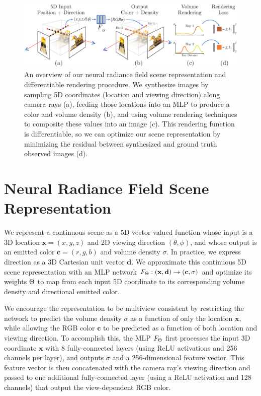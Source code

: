 \documentclass[runningheads]{llncs}
\begin{document}
\begin{figure}[t]
\centering
\includegraphics[width=\linewidth]{figs/pipeline_v2_small.pdf}
\caption{
An overview of our neural radiance field scene representation and differentiable rendering procedure. We synthesize images by sampling 5D coordinates (location and viewing direction) along camera rays (a), feeding those locations into an MLP to produce a color and volume density (b), and using volume rendering techniques to composite these values into an image (c). This rendering function is differentiable, so we can optimize our scene representation by minimizing the residual between synthesized and ground truth observed images (d).
}
\label{fig:pipeline}
\end{figure}


\section{Neural Radiance Field Scene Representation}

We represent a continuous scene as a 5D vector-valued function whose input is a 3D location $\mathbf{x} = (x,y,z)$ and 2D viewing direction $(\theta, \phi)$, and whose output is an emitted color $\mathbf{c} = (r,g,b)$ and volume density $\sigma$. In practice, we express direction as a 3D Cartesian unit vector $\mathbf{d}$. We approximate this continuous 5D scene representation with an MLP network $F_{\mathrm{\Theta}} : (\mathbf{x}, \mathbf{d}) \to (\mathbf{c},\sigma)$ and optimize its weights $\mathrm{\Theta}$ to map from each input 5D coordinate to its corresponding volume density and directional emitted color. 

We encourage the representation to be multiview consistent by restricting the network to predict the volume density $\sigma$ as a function of only the location $\mathbf{x}$, while allowing the RGB color $\mathbf{c}$ to be predicted as a function of both location and viewing direction. To accomplish this, the MLP $F_{\mathrm{\Theta}}$ first processes the input 3D coordinate $\mathbf{x}$ with 8 fully-connected layers (using ReLU activations and 256 channels per layer), and outputs $\sigma$ and a 256-dimensional feature vector. This feature vector is then concatenated with the camera ray's viewing direction and passed to one additional fully-connected layer (using a ReLU activation and 128 channels) that output the view-dependent RGB color.
\end{document}
